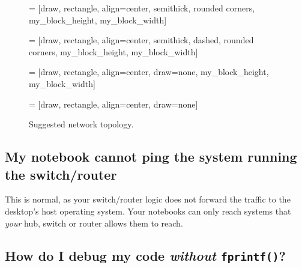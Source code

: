 \documentclass{article}
\begin{document}
\begin{figure}[h!]
 = [draw, rectangle, align=center, semithick, rounded corners,
  my_block_height, my_block_width]

 = [draw, rectangle, align=center, semithick, dashed, rounded corners,
  my_block_height, my_block_width]

 = [draw, rectangle, align=center, draw=none,
  my_block_height, my_block_width]

 = [draw, rectangle, align=center, draw=none]

 \caption{Suggested network topology.}
  \label{fig:setup}
\end{figure}

\subsection{My notebook cannot ping the system running the switch/router}

This is normal, as your switch/router logic does not forward the
traffic to the desktop's host operating system.  Your notebooks can
only reach systems that {\em your} hub, switch or router allows them
to reach.


\subsection{How do I debug my code {\em without} {\tt fprintf()}?}
\end{document}
